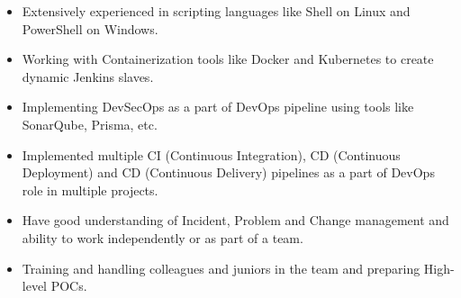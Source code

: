 \documentclass[12pt, a4paper]{article}
\begin{document}
\begin{itemize}[noitemsep, nolistsep]
\item Extensively experienced in scripting languages like Shell on Linux and PowerShell on Windows.
\item Working with Containerization tools like Docker and Kubernetes to create dynamic Jenkins slaves.
\item Implementing DevSecOps as a part of DevOps pipeline using tools like SonarQube, Prisma, etc.
\item Implemented multiple CI (Continuous Integration), CD (Continuous Deployment) and CD (Continuous Delivery) pipelines as a part of DevOps role in multiple projects.
\item Have good understanding of Incident, Problem and Change management and ability to work independently or as part of a team.
\item Training and handling colleagues and juniors in the team and preparing High-level POCs.
\end{itemize}
\pagebreak
\end{document}
